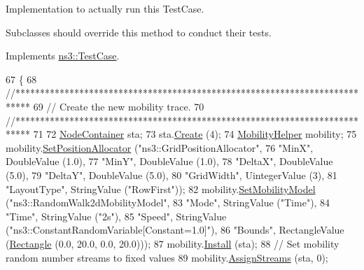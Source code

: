 Implementation to actually run this Test\+Case. 

Subclasses should override this method to conduct their tests. 

Implements \hyperlink{classns3_1_1TestCase_a8ff74680cf017ed42011e4be51917a24}{ns3\+::\+Test\+Case}.


\begin{DoxyCode}
67 \{
68   \textcolor{comment}{//***************************************************************************}
69   \textcolor{comment}{// Create the new mobility trace.}
70   \textcolor{comment}{//***************************************************************************}
71 
72   \hyperlink{classns3_1_1NodeContainer}{NodeContainer} sta;
73   sta.\hyperlink{classns3_1_1NodeContainer_a787f059e2813e8b951cc6914d11dfe69}{Create} (4);
74   \hyperlink{classns3_1_1MobilityHelper}{MobilityHelper} mobility;
75   mobility.\hyperlink{classns3_1_1MobilityHelper_ac59d5295076be3cc11021566713a28c5}{SetPositionAllocator} (\textcolor{stringliteral}{"ns3::GridPositionAllocator"},
76                                  \textcolor{stringliteral}{"MinX"}, DoubleValue (1.0),
77                                  \textcolor{stringliteral}{"MinY"}, DoubleValue (1.0),
78                                  \textcolor{stringliteral}{"DeltaX"}, DoubleValue (5.0),
79                                  \textcolor{stringliteral}{"DeltaY"}, DoubleValue (5.0),
80                                  \textcolor{stringliteral}{"GridWidth"}, UintegerValue (3),
81                                  \textcolor{stringliteral}{"LayoutType"}, StringValue (\textcolor{stringliteral}{"RowFirst"}));
82   mobility.\hyperlink{classns3_1_1MobilityHelper_a030275011b6f40682e70534d30280aba}{SetMobilityModel} (\textcolor{stringliteral}{"ns3::RandomWalk2dMobilityModel"},
83                              \textcolor{stringliteral}{"Mode"}, StringValue (\textcolor{stringliteral}{"Time"}),
84                              \textcolor{stringliteral}{"Time"}, StringValue (\textcolor{stringliteral}{"2s"}),
85                              \textcolor{stringliteral}{"Speed"}, StringValue (\textcolor{stringliteral}{"ns3::ConstantRandomVariable[Constant=1.0]"}),
86                              \textcolor{stringliteral}{"Bounds"}, RectangleValue (\hyperlink{classns3_1_1Rectangle}{Rectangle} (0.0, 20.0, 0.0, 20.0)));
87   mobility.\hyperlink{classns3_1_1MobilityHelper_a07737960ee95c0777109cf2994dd97ae}{Install} (sta);
88   \textcolor{comment}{// Set mobility random number streams to fixed values}
89   mobility.\hyperlink{classns3_1_1MobilityHelper_a13e35a27577e5927574af6cfdec4c605}{AssignStreams} (sta, 0);

\end{DoxyCode}
